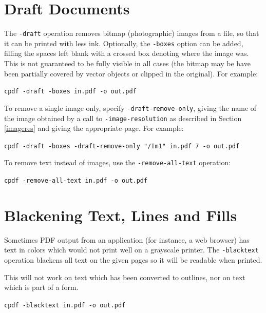\documentclass{book}
\begin{document}
  \section{Draft Documents}
\label{draft}
    The \texttt{-draft} operation removes bitmap (photographic) images from a
file, so that it can be printed with less ink. Optionally, the
\texttt{-boxes} option can be added, filling the spaces left blank with a
crossed box denoting where the image was. This is not guaranteed to be fully
visible in all cases (the bitmap may be have been partially covered by vector
objects or clipped in the original). For example:
  \begin{framed}
    \noindent\small\verb!cpdf -draft -boxes in.pdf -o out.pdf!
  \end{framed}

\noindent To remove a single image only, specify \texttt{-draft-remove-only}, giving the name of the image obtained by a call to \texttt{-image-resolution} as described in Section \ref{imageres} and giving the appropriate page. For example:

  \begin{framed}
    \noindent\small\verb!cpdf -draft -boxes -draft-remove-only "/Im1" in.pdf 7 -o out.pdf!
  \end{framed}

\noindent To remove text instead of images, use the \texttt{-remove-all-text} operation:

  \begin{framed}
    \noindent\small\verb!cpdf -remove-all-text in.pdf -o out.pdf!
  \end{framed}

  \section{Blackening Text, Lines and Fills}
  Sometimes PDF output from an application (for instance, a web browser) has
text in colors which would not print well on a grayscale printer. The
\texttt{-blacktext} operation blackens all text on the given pages so it will be readable
when printed.

  This will not work on text which has been converted to outlines, nor on text
which is part of a form.
  \begin{framed}
    \noindent\small\verb!cpdf -blacktext in.pdf -o out.pdf!
  \end{framed}

\end{document}

